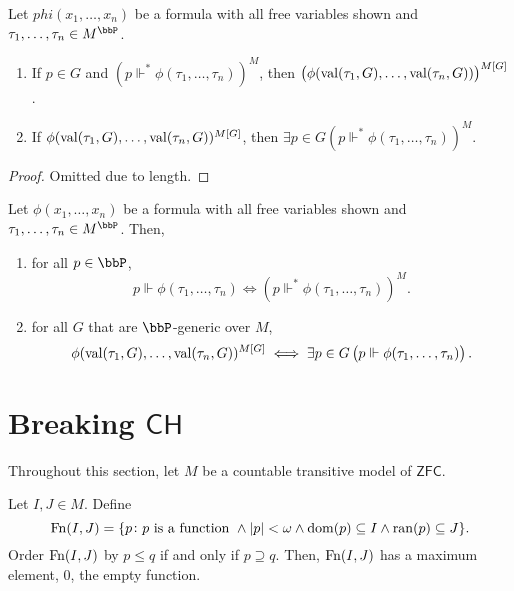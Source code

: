 \begin{lemma}
    Let $phi(x_1,\dots,x_n)$ be a formula with all free variables shown and $\tau_1,\dots,\tau_n\in M^\bbP$. 
    \begin{enumerate}
        \item If $p\in G$ and $(p\Vdash^*\phi(\tau_1,\dots,\tau_n))^{M}$, then $\left(\phi(\operatorname{val}(\tau_1, G),\dots,\operatorname{val}(\tau_n, G))\right)^{M[G]}$.
        
        \item If $\phi(\operatorname{val}(\tau_1, G),\dots,\operatorname{val}(\tau_n, G))^{M[G]}$, then $\exists p\in G(p\Vdash^*\phi(\tau_1,\dots,\tau_n))^{M}$.
    \end{enumerate}
\end{lemma}
\begin{proof}
    Omitted due to length.
\end{proof}

\begin{theorem}
    Let $\phi(x_1,\dots,x_n)$ be a formula with all free variables shown and $\tau_1,\dots,\tau_n\in M^\bbP$. Then, 
    \begin{enumerate}
        \item for all $p\in\bbP$, 
        \begin{equation*}
            p\Vdash\phi(\tau_1,\dots,\tau_n)\iff\left(p\Vdash^*\phi(\tau_1,\dots,\tau_n)\right)^M.
        \end{equation*}

        \item for all $G$ that are $\bbP$-generic over $M$,
        \begin{equation*}
            \phi(\operatorname{val}(\tau_1, G),\dots,\operatorname{val}(\tau_n, G))^{M[G]}\iff\exists p\in G\left(p\Vdash\phi(\tau_1,\dots,\tau_n)\right).
        \end{equation*}
    \end{enumerate}
\end{theorem}

\section{Breaking $\mathsf{CH}$}

Throughout this section, let $M$ be a countable transitive model of $\mathsf{ZFC}$.

\begin{definition}
    Let $I, J\in M$. Define 
    \begin{equation*}
        \operatorname{Fn}(I, J) = \{p\colon p\text{ is a function }\wedge |p| < \omega\wedge\operatorname{dom}(p)\subseteq I\wedge\operatorname{ran}(p)\subseteq J\}.
    \end{equation*}
    Order $\operatorname{Fn}(I, J)$ by $p\le q$ if and only if $p\supseteq q$. Then, $\operatorname{Fn}(I, J)$ has a maximum element, $0$, the empty function.
\end{definition}

